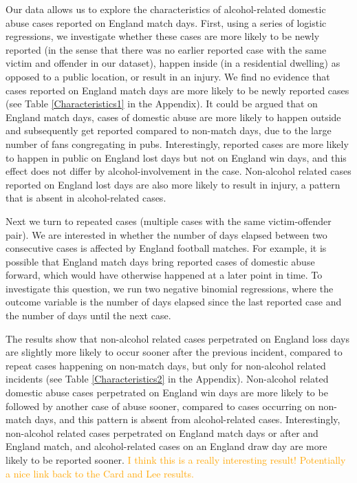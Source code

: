 \documentclass[12pt, letterpaper]{article}
\newcommand{\TM}[1] {{\textcolor{orange}{#1}}}
\begin{document}
Our data allows us to explore the characteristics of alcohol-related domestic abuse cases reported on England match days. First, using a series of logistic regressions, we investigate whether these cases are more likely to be newly reported (in the sense that there was no earlier reported case with the same victim and offender in our dataset), happen inside (in a residential dwelling) as opposed to a public location, or result in an injury. We find no evidence that cases reported on England match days are more likely to be newly reported cases (see Table \ref{Characteristics1} in the Appendix). It could be argued that on England match days, cases of domestic abuse are more likely to happen outside and subsequently get reported compared to non-match days, due to the large number of fans congregating in pubs. Interestingly, reported cases are more likely to happen in public on England lost days but not on England win days, and this effect does not differ by alcohol-involvement in the case. Non-alcohol related cases reported on England lost days are also more likely to result in injury, a pattern that is absent in alcohol-related cases.

Next we turn to repeated cases (multiple cases with the same victim-offender pair). We are interested in whether the number of days elapsed between two consecutive cases is affected by England football matches. For example, it is possible that England match days bring reported cases of domestic abuse forward, which would have otherwise happened at a later point in time. To investigate this question, we run two negative binomial regressions, where the outcome variable is the number of days elapsed since the last reported case and the number of days until the next case. 

The results show that non-alcohol related cases perpetrated on England loss days are slightly more likely to occur sooner after the previous incident, compared to repeat cases happening on non-match days, but only for non-alcohol related incidents (see Table \ref{Characteristics2} in the Appendix). Non-alcohol related domestic abuse cases perpetrated on England win days are more likely to be followed by another case of abuse sooner, compared to cases occurring on non-match days, and this pattern is absent from alcohol-related cases. Interestingly, non-alcohol related cases perpetrated on England match days or after and England match, and alcohol-related cases on an England draw day are more likely to be reported sooner. \TM{I think this is a really interesting result! Potentially a nice link back to the Card and Lee results.}
\end{document}
